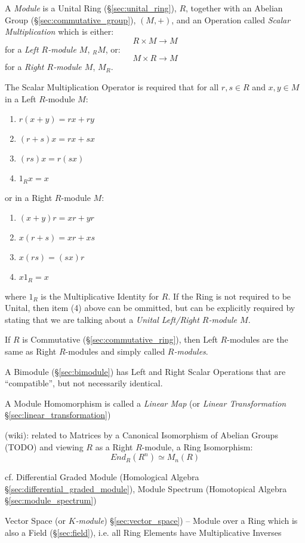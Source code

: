A \emph{Module} is a Unital Ring (\S\ref{sec:unital_ring}), $R$, together with
an Abelian Group (\S\ref{sec:commutative_group}), $(M, +)$, and an Operation
called \emph{Scalar Multiplication} which is either:
\[ R \times M \rightarrow M \]
for a \emph{Left $R$-module $M$}, $_R M$, or:
\[ M \times R \rightarrow M \]
for a \emph{Right $R$-module $M$}, $M_R$.

The Scalar Multiplication Operator is required that for all $r,s \in
R$ and $x,y \in M$ in a Left $R$-module $M$:
\begin{enumerate}
    \item $r(x + y) = rx + ry$
    \item $(r + s)x = rx + sx$
    \item $(rs)x = r(sx)$
    \item $1_Rx = x$
\end{enumerate}
or in a Right $R$-module $M$:
\begin{enumerate}
    \item $(x + y)r = xr + yr$
    \item $x(r + s) = xr + xs$
    \item $x(rs) = (sx)r$
    \item $x 1_R = x$
\end{enumerate}
where $1_R$ is the Multiplicative Identity for $R$. If the Ring is not
required to be Unital, then item (4) above can be ommitted, but can be
explicitly required by stating that we are talking about a
\emph{Unital Left/Right $R$-module $M$}.

If $R$ is Commutative (\S\ref{sec:commutative_ring}), then Left $R$-modules are
the same as Right $R$-modules and simply called \emph{$R$-modules}.

A Bimodule (\S\ref{sec:bimodule}) has Left and Right Scalar Operations that are
``compatible'', but not necessarily identical.

A Module Homomorphism is called a \emph{Linear Map} (or \emph{Linear
  Transformation} \S\ref{sec:linear_transformation})

(wiki): related to Matrices by a Canonical Isomorphism of Abelian Groups (TODO)
and viewing $R$ as a Right $R$-module, a Ring Isomorphism:
\[
  End_R(R^n) \simeq M_n(R)
\]

cf. Differential Graded Module (Homological Algebra
\S\ref{sec:differential_graded_module}), Module Spectrum (Homotopical Algebra
\S\ref{sec:module_spectrum})

\fist Vector Space (or \emph{$K$-module}) \S\ref{sec:vector_space}) -- Module
over a Ring which is also a Field (\S\ref{sec:field}), i.e. all Ring Elements
have Multiplicative Inverses

